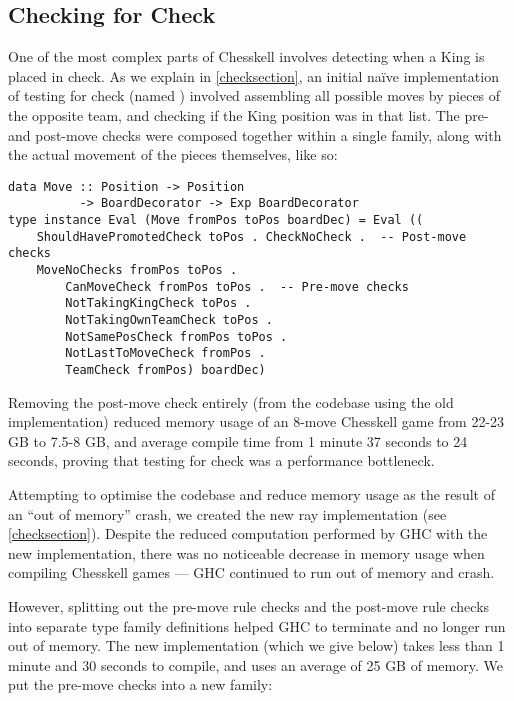 \subsection{Checking for Check}

One of the most complex parts of Chesskell involves detecting when a King is placed in check. As we explain in \cref{checksection}, an initial na\"ive implementation of testing for check (named ) involved assembling all possible moves by pieces of the opposite team, and checking if the King position was in that list. The pre- and post-move checks were composed together within a single family, along with the actual movement of the pieces themselves, like so:

\begin{lstlisting}
data Move :: Position -> Position
          -> BoardDecorator -> Exp BoardDecorator
type instance Eval (Move fromPos toPos boardDec) = Eval ((
    ShouldHavePromotedCheck toPos . CheckNoCheck .  -- Post-move checks
    MoveNoChecks fromPos toPos .
        CanMoveCheck fromPos toPos .  -- Pre-move checks
        NotTakingKingCheck toPos .
        NotTakingOwnTeamCheck toPos .
        NotSamePosCheck fromPos toPos .
        NotLastToMoveCheck fromPos .
        TeamCheck fromPos) boardDec)
\end{lstlisting}

Removing the  post-move check entirely (from the codebase using the old implementation) reduced memory usage of an 8-move Chesskell game from 22-23 GB to 7.5-8 GB, and average compile time from 1 minute 37 seconds to 24 seconds, proving that testing for check was a performance bottleneck.

Attempting to optimise the codebase and reduce memory usage as the result of an ``out of memory'' crash, we created the new ray implementation (see \cref{checksection}). Despite the reduced computation performed by GHC with the new implementation, there was no noticeable decrease in memory usage when compiling Chesskell games --- GHC continued to run out of memory and crash.

However, splitting out the pre-move rule checks and the post-move rule checks into separate type family definitions helped GHC to terminate and no longer run out of memory. The new implementation (which we give below) takes less than 1 minute and 30 seconds to compile, and uses an average of 25 GB of memory. We put the pre-move checks into a new  family:

